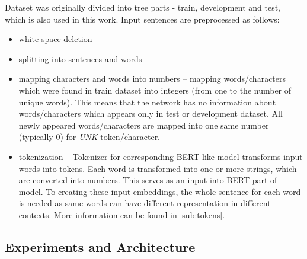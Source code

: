 Dataset was originally divided into tree parts - train, development and test, which is also used in this work. Input sentences are preprocessed as follows:
\begin{itemize}
\item white space deletion
\item splitting into sentences and words
\item mapping characters and words into numbers -- mapping  words/characters which were found in train dataset into integers (from one to the number of unique words). This means that the network has no information about words/characters which appears only in test or development dataset. All newly appeared words/characters are mapped into one same number (typically $0$) for \textit{UNK} token/character.
\item tokenization -- Tokenizer for corresponding BERT-like model transforms input words into tokens. Each word is transformed into one or more strings, which are converted into numbers. This serves as an input into BERT part of model. To creating these input embeddings, the whole sentence for each word is needed as same words can have different representation in different contexts. More information can be found in \ref{sub:tokens}.
\end{itemize}

\subsection{Experiments and Architecture}




